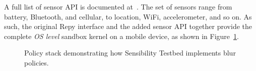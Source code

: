 A full list of sensor API is documented at~\cite{sensor-api}. The set
of sensors range from battery, Bluetooth, and cellular, to location, WiFi, 
accelerometer, and so on. 
As such, the original Repy interface and the added sensor API together 
provide the complete \textit{OS level} sandbox kernel on a mobile 
device, as shown in Figure~\ref{fig-blur}.

\begin{figure}
\caption{\small Policy stack demonstrating how Sensibility Testbed implements blur policies. 
\label{fig-blur}}
\end{figure}

